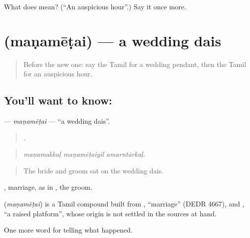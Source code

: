 \begin{tcolorbox}[breakable,colback=teal!4,colframe=teal!35!black,title={Before you move on}]
What does  mean? (\textquotedblleft{}An auspicious hour\textquotedblright{}.) Say it once more.
\end{tcolorbox}
\section[\texorpdfstring{\ta{மணமேடை} (maṇamēṭai)}{மணமேடை (maṇamēṭai)}]{ (maṇamēṭai) — a wedding dais}

\label{lesson:TA-C322-manametai}



\begin{quote}
Before the new one: say the Tamil for a wedding pendant, then the Tamil for an auspicious hour.
\end{quote}

\subsection*{You'll want to know: }
\textbf{} — \emph{maṇamēṭai} — \textquotedblleft{}a wedding dais\textquotedblright{}.

\begin{quote}
  .
\end{quote}

\begin{quote}
\emph{maṇamakkaḷ maṇamēṭaiyil amarntārkaḷ.}
\end{quote}

\begin{quote}
The bride and groom sat on the wedding dais.
\end{quote}

, marriage, as in , the groom.

\begin{cousinweb}
\textbf{} (\emph{maṇamēṭai}) is a Tamil compound built from , \textquotedblleft{}marriage\textquotedblright{} (DEDR 4667), and , \textquotedblleft{}a raised platform\textquotedblright{}, whose origin is not settled in the sources at hand.
\end{cousinweb}

\begin{grammarlens}[title={What you've built}]
One more word for telling what happened.
\end{grammarlens}

